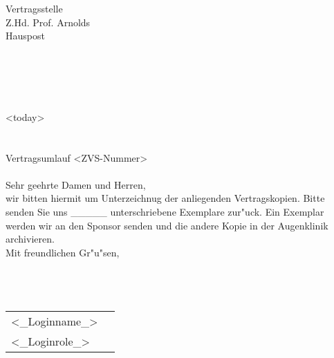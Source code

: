\documentclass{scrreprt}
\begin{document}
\baselineskip15pt
\setlength{\headheight}{7\baselineskip}
\setlength{\oddsidemargin}{-3mm} 
\addtolength{\textwidth}{2cm}

\noindent Vertragsstelle\\
\noindent Z.Hd. Prof. Arnolds\\
\noindent Hauspost \\
\noindent \\
\\ \\ 
\\ \\ 

\hspace{12.5cm} <today>\\ \\ \\ 

\noindent Vertragsumlauf <ZVS-Nummer>\\ \\

\noindent  Sehr geehrte Damen und Herren,\\

\noindent wir bitten hiermit um Unterzeichnug der anliegenden Vertragskopien. Bitte senden Sie uns \_\_\_\_\_ unterschriebene Exemplare zur"uck. Ein Exemplar werden wir an den Sponsor senden und die andere Kopie in der Augenklinik archivieren.\\

\noindent Mit freundlichen Gr"u"sen, \\ \\   \\ \\

\hspace*{-7mm}  \begin{tabularx}{20cm}{XX}
<_Loginname_>\\ 
<_Loginrole_> \\ 
\end{tabularx}
\end{document}
